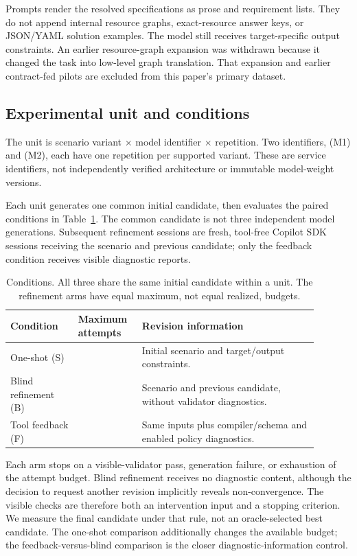 \documentclass[11pt]{article}
\begin{document}
Prompts render the resolved specifications as prose and requirement lists. They
do not append internal resource graphs, exact-resource answer keys, or JSON/YAML
solution examples. The model still receives target-specific output constraints.
An earlier resource-graph expansion was withdrawn because it changed the task
into low-level graph translation. That expansion and earlier contract-fed pilots
are excluded from this paper's primary dataset.

\subsection{Experimental unit and conditions}
The unit is scenario variant $\times$ model identifier $\times$ repetition.
Two identifiers, \texttt{\ModelOne{}} (M1) and \texttt{\ModelTwo{}} (M2), each have
one repetition per supported variant. These are service identifiers, not
independently verified architecture or immutable model-weight versions.

Each unit generates one common initial candidate, then evaluates the paired
conditions in Table~\ref{tab:conditions}. The common candidate is not three
independent model generations. Subsequent refinement sessions are fresh,
tool-free Copilot SDK sessions receiving the scenario and previous candidate;
only the feedback condition receives visible diagnostic reports.

\begin{table}[tbp]
\centering\small
\begin{tabular}{>{\raggedright\arraybackslash}p{0.20\linewidth}>{\raggedright\arraybackslash}p{0.17\linewidth}>{\raggedright\arraybackslash}p{0.52\linewidth}}
\toprule
Condition & Maximum attempts & Revision information \\
\midrule
One-shot (S) & 1 & Initial scenario and target/output constraints. \\
Blind refinement (B) & \IterationBudget{} & Scenario and previous candidate, without validator diagnostics. \\
Tool feedback (F) & \IterationBudget{} & Same inputs plus compiler/schema and enabled policy diagnostics. \\
\bottomrule
\end{tabular}
\caption{Conditions. All three share the same initial candidate within a unit.
The refinement arms have equal maximum, not equal realized, budgets.}
\label{tab:conditions}
\end{table}

Each arm stops on a visible-validator pass, generation failure, or exhaustion of
the attempt budget. Blind refinement receives no diagnostic content, although
the decision to request another revision implicitly reveals non-convergence.
The visible checks are therefore both an intervention input and a stopping
criterion. We measure the final candidate under that rule, not an oracle-selected
best candidate. The one-shot comparison additionally changes the available budget;
the feedback-versus-blind comparison is the closer diagnostic-information control.
\end{document}

